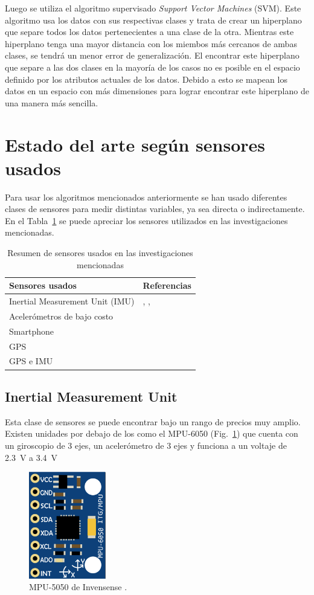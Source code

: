 Luego se utiliza el algoritmo supervisado {\it Support Vector Machines} (SVM). Este algoritmo usa los datos con sus respectivas clases y trata de crear un hiperplano que separe todos los datos pertenecientes a una clase de la otra. Mientras este hiperplano tenga una mayor distancia con los miembos más cercanos de ambas clases, se tendrá un menor error de generalización. El encontrar este hiperplano que separe a las dos clases en la mayoría de los casos no es posible en el espacio definido por los atributos actuales de los datos. Debido a esto se mapean los datos en un espacio con más dimensiones para lograr encontrar este hiperplano de una manera más sencilla.

\section{Estado del arte según sensores usados}

Para usar los algoritmos mencionados anteriormente se han usado diferentes clases de sensores para medir distintas variables, ya sea directa o indirectamente. En el Tabla~\ref{diag:2.3} se puede apreciar los sensores utilizados en las investigaciones mencionadas.

\begin{table}[htpb!]
\centering
\caption{Resumen de sensores usados en las investigaciones mencionadas}
\begin{tabular}{@{}ll@{}}
\toprule
Sensores usados & Referencias \\ \midrule
Inertial Measurement Unit (IMU)& \cite{4938719}, \cite{7727682}, \cite{6629603} \\
Acelerómetros de bajo costo & \cite{6294318} \\
Smartphone & \cite{6083078} \\
GPS & \cite{constantinescu} \\
GPS e IMU & \cite{6957822} \\ \bottomrule
\end{tabular}
\label{diag:2.3}
\end{table}

\subsection{Inertial Measurement Unit}
Esta clase de sensores se puede encontrar bajo un rango de precios muy amplio. Existen unidades por debajo de los  como el MPU-6050 (Fig.~\ref{fig:2.7}) que cuenta con un giroscopio de 3 ejes, un acelerómetro de 3 ejes y funciona a un voltaje de \SI[mode=text]{2.3}{V} a \SI[mode=text]{3.4}{V} \cite{invensense}

\begin{figure}[htpb!]
\centering
\includegraphics[width=0.3\textwidth]{Fig7}
\caption[MPU-5050 de Invensense]{MPU-5050 de Invensense \cite{invensense}.}
\label{fig:2.7}
\end{figure}
